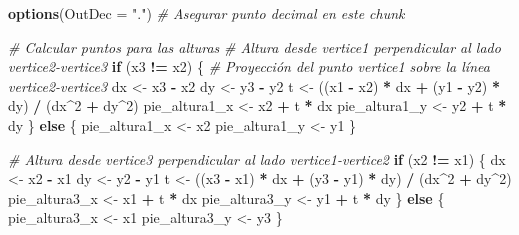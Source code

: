 \documentclass[
]{article}
\newenvironment{Shaded}{\begin{snugshade}}{\end{snugshade}}
\newcommand{\AttributeTok}[1]{\textcolor[rgb]{0.13,0.29,0.53}{#1}}
\newcommand{\CommentTok}[1]{\textcolor[rgb]{0.56,0.35,0.01}{\textit{#1}}}
\newcommand{\ControlFlowTok}[1]{\textcolor[rgb]{0.13,0.29,0.53}{\textbf{#1}}}
\newcommand{\DecValTok}[1]{\textcolor[rgb]{0.00,0.00,0.81}{#1}}
\newcommand{\FunctionTok}[1]{\textcolor[rgb]{0.13,0.29,0.53}{\textbf{#1}}}
\newcommand{\NormalTok}[1]{#1}
\newcommand{\OtherTok}[1]{\textcolor[rgb]{0.56,0.35,0.01}{#1}}
\newcommand{\SpecialCharTok}[1]{\textcolor[rgb]{0.81,0.36,0.00}{\textbf{#1}}}
\newcommand{\StringTok}[1]{\textcolor[rgb]{0.31,0.60,0.02}{#1}}
\begin{document}
\begin{Shaded}
\begin{Highlighting}[]
\FunctionTok{options}\NormalTok{(}\AttributeTok{OutDec =} \StringTok{"."}\NormalTok{)  }\CommentTok{\# Asegurar punto decimal en este chunk}

\CommentTok{\# Calcular puntos para las alturas}
\CommentTok{\# Altura desde vertice1 perpendicular al lado vertice2{-}vertice3}
\ControlFlowTok{if}\NormalTok{ (x3 }\SpecialCharTok{!=}\NormalTok{ x2) \{}
  \CommentTok{\# Proyección del punto vertice1 sobre la línea vertice2{-}vertice3}
\NormalTok{  dx }\OtherTok{\textless{}{-}}\NormalTok{ x3 }\SpecialCharTok{{-}}\NormalTok{ x2}
\NormalTok{  dy }\OtherTok{\textless{}{-}}\NormalTok{ y3 }\SpecialCharTok{{-}}\NormalTok{ y2}
\NormalTok{  t }\OtherTok{\textless{}{-}}\NormalTok{ ((x1 }\SpecialCharTok{{-}}\NormalTok{ x2) }\SpecialCharTok{*}\NormalTok{ dx }\SpecialCharTok{+}\NormalTok{ (y1 }\SpecialCharTok{{-}}\NormalTok{ y2) }\SpecialCharTok{*}\NormalTok{ dy) }\SpecialCharTok{/}\NormalTok{ (dx}\SpecialCharTok{\^{}}\DecValTok{2} \SpecialCharTok{+}\NormalTok{ dy}\SpecialCharTok{\^{}}\DecValTok{2}\NormalTok{)}
\NormalTok{  pie\_altura1\_x }\OtherTok{\textless{}{-}}\NormalTok{ x2 }\SpecialCharTok{+}\NormalTok{ t }\SpecialCharTok{*}\NormalTok{ dx}
\NormalTok{  pie\_altura1\_y }\OtherTok{\textless{}{-}}\NormalTok{ y2 }\SpecialCharTok{+}\NormalTok{ t }\SpecialCharTok{*}\NormalTok{ dy}
\NormalTok{\} }\ControlFlowTok{else}\NormalTok{ \{}
\NormalTok{  pie\_altura1\_x }\OtherTok{\textless{}{-}}\NormalTok{ x2}
\NormalTok{  pie\_altura1\_y }\OtherTok{\textless{}{-}}\NormalTok{ y1}
\NormalTok{\}}

\CommentTok{\# Altura desde vertice3 perpendicular al lado vertice1{-}vertice2}
\ControlFlowTok{if}\NormalTok{ (x2 }\SpecialCharTok{!=}\NormalTok{ x1) \{}
\NormalTok{  dx }\OtherTok{\textless{}{-}}\NormalTok{ x2 }\SpecialCharTok{{-}}\NormalTok{ x1}
\NormalTok{  dy }\OtherTok{\textless{}{-}}\NormalTok{ y2 }\SpecialCharTok{{-}}\NormalTok{ y1}
\NormalTok{  t }\OtherTok{\textless{}{-}}\NormalTok{ ((x3 }\SpecialCharTok{{-}}\NormalTok{ x1) }\SpecialCharTok{*}\NormalTok{ dx }\SpecialCharTok{+}\NormalTok{ (y3 }\SpecialCharTok{{-}}\NormalTok{ y1) }\SpecialCharTok{*}\NormalTok{ dy) }\SpecialCharTok{/}\NormalTok{ (dx}\SpecialCharTok{\^{}}\DecValTok{2} \SpecialCharTok{+}\NormalTok{ dy}\SpecialCharTok{\^{}}\DecValTok{2}\NormalTok{)}
\NormalTok{  pie\_altura3\_x }\OtherTok{\textless{}{-}}\NormalTok{ x1 }\SpecialCharTok{+}\NormalTok{ t }\SpecialCharTok{*}\NormalTok{ dx}
\NormalTok{  pie\_altura3\_y }\OtherTok{\textless{}{-}}\NormalTok{ y1 }\SpecialCharTok{+}\NormalTok{ t }\SpecialCharTok{*}\NormalTok{ dy}
\NormalTok{\} }\ControlFlowTok{else}\NormalTok{ \{}
\NormalTok{  pie\_altura3\_x }\OtherTok{\textless{}{-}}\NormalTok{ x1}
\NormalTok{  pie\_altura3\_y }\OtherTok{\textless{}{-}}\NormalTok{ y3}
\NormalTok{\}}


\end{Highlighting}
\end{Shaded}
\end{document}

